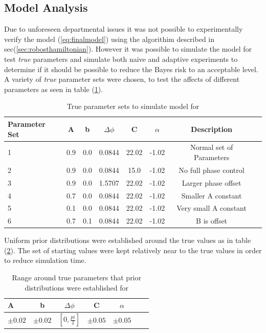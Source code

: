 \subsection{Model Analysis}
Due to unforeseen departmental issues it was not possible to experimentally verify the model (\ref{eq:finalmodel}) using the algorithim described in sec(\ref{sec:robosthamiltonian}). However it was possible to simulate the model for test \textit{true} parameters and simulate both naive and adaptive experiments to determine if it should be possible to reduce the Bayes risk to an acceptable level. A variety of \textit{true} parameter sets were chosen, to test the affects of different parameters as seen in table (\ref{tab:trueparams}). 
\begin{table}[h]
\begin{center}
\begin{tabular}{l*{6}{c}r}
Parameter Set     & A&b& $\Delta\phi$ & C & $\alpha$ & Description \\
\hline
1& 0.9& 0.0& 0.0844& 22.02& -1.02 & Normal set of Parameters  \\
2&  0.9& 0.0& 0.0844& 15.0& -1.02 & No full phase control \\
3& 0.9& 0.0& 1.5707& 22.02& -1.02 &   Larger phase offset \\
4& 0.7& 0.0& 0.0844& 22.02& -1.02 & Smaller A constant\\
5& 0.1& 0.0& 0.0844& 22.02& -1.02 & Very small A constant\\
6&  0.7& 0.1& 0.0844& 22.02& -1.02 & B is offset\\
\end{tabular}
\caption{True parameter sets to simulate model for}
\label{tab:trueparams}
\end{center}
\end{table}
Uniform prior distributions were established around the true values as in table (\ref{tab:around}). The set of starting values were kept relatively near to the true values in order to reduce simulation time. 
\begin{table}[h]
\begin{center}
\begin{tabular}{l*{5}{c}r}
A&b& $\Delta\phi$ & C & $\alpha$ \\
\hline
 $\pm0.02$ & $\pm0.02$ & $[0,\frac{pi}{2}]$ & $\pm0.05$ & $\pm0.05$
\end{tabular}
\caption{Range around true parameters that prior distributions were established for}
\label{tab:around}
\end{center}
\end{table}
